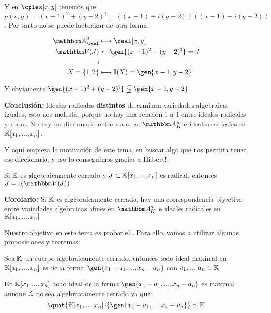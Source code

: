 \begin{itemize}
\begin{example}
\begin{enumerate}
			Y en $\cplex[x,y]$ tenemos que $p(x,y)=(x-1)^2+(y-2)^2=((x-1)+i(y-2))((x-1)-i(y-2))$. Por tanto no se puede factorizar de otra forma.

			\begin{align*}
				\A^2_{\real} & \longmapsto  \real[x,y] \\
				\V(J) & \leftarrow  \gen{(x-1)^2+(y-2)^2}=J \\
				\shortparallel & \\
				X=\{1,2\} & \longmapsto  \I(X)=\gen{x-1,y-2}\\
			\end{align*}

			Y obviamente $\gen{(x-1)^2+(y-2)^2} \subsetneqq \gen{x-1,y-2}$
		\end{enumerate}
	\end{example}
\end{itemize}

\textbf{Conclusión:} Ideales radicales \textbf{distintos} determinan variedades algebraicas iguales, esto nos molesta, porque no hay una relación 1 a 1 entre ideales radicales y v.a.a.. No hay un diccionario entre v.a.a. en $\Akn$ e ideales radicales en $\mathbb{K}[x_1,...,x_n]$.

Y aquí empieza la motivación de este tema, en buscar algo que nos permita tener ese diccionario, y eso lo conseguimos gracias a Hilbert!!

\begin{theorem}\label{thm:tma_0_hilbert}
	Si $\mathbb{K}$ es algebraicamente cerrado y $J \subset \mathbb{K}[x_1,...,x_n]$ es radical, entonces $J=\I(\V(J))$
\end{theorem}



\textbf{Corolario:}	Si $\mathbb{K}$ es algebraicamente cerrado, hay una correspondencia biyectiva entre variedades algebraicas afines en $\Akn$ e ideales radicales en $\mathbb{K}[x_1,...,x_n]$

Nuestro objetivo en este tema es probar el . Para ello, vamos a utilizar algunas proposiciones y teoremas:

\begin{theorem} \label{thm:Basico}
	Sea $\mathbb{K}$ un cuerpo algebraicamente cerrado, entonces todo ideal maximal en $\mathbb{K}[x_1,...,x_n]$ es de la forma $\gen{x_1-a_1,...,x_n-a_n}$ con $a_1,...,a_n \in \mathbb{K}$
\end{theorem}

\obs En $\mathbb{K}[x_1,...,x_n]$ todo ideal de la forma $\gen{x_1-a_1,...,x_n-a_n}$ es maximal aunque $\mathbb{K}$ no sea algebraicamente cerrado ya que:
$$ \quot{\K[x_1,...,x_n]}{\gen{x_1-a_1,...,x_n-a_n}} \simeq \K $$

